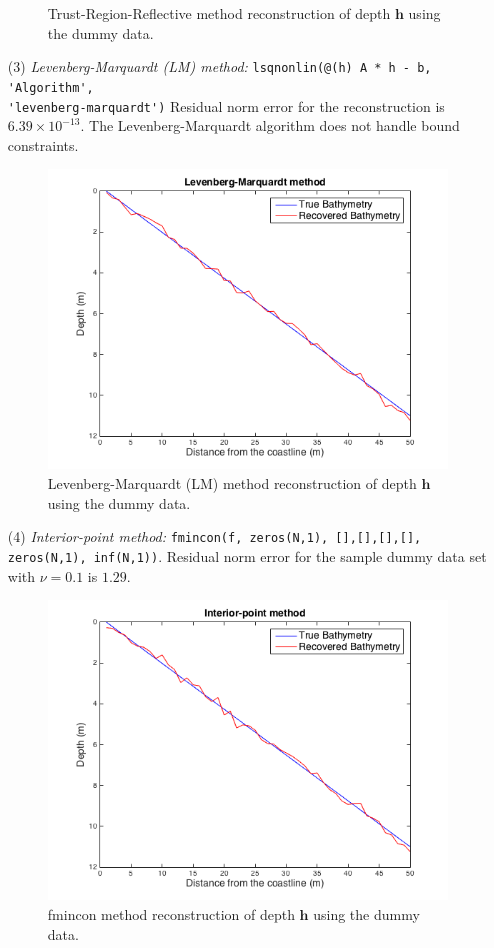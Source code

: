 \begin{itemize}
\begin{figure}[H]
\caption{Trust-Region-Reflective method reconstruction of depth $\mathbf{h}$ using the dummy data.}
\label{trust_region_fig}
\end{figure}
\item[(3)]  \textit{Levenberg-Marquardt (LM) method:}  
\verb|lsqnonlin(@(h) A * h - b, 'Algorithm',| \\ \verb|'levenberg-marquardt')|
Residual norm error for the reconstruction is $6.39 \times 10^{-13}$. The Levenberg-Marquardt algorithm does not handle bound constraints. 
\begin{figure}[H]
\center
\includegraphics[scale=0.6]{img/LM_linear.png} 
\caption{Levenberg-Marquardt (LM) method reconstruction of depth $\mathbf{h}$ using the dummy data.}
\label{LM_fig}
\end{figure}
\item[(4)]  \textit{Interior-point method:} \verb|fmincon(f, zeros(N,1), [],[],[],[], zeros(N,1), inf(N,1))|. Residual norm error for the sample dummy data set  with $\nu = 0.1$ is $1.29$. 
\begin{figure}[H]
\center
\includegraphics[scale=0.6]{img/fmincon_linear.png} 
\caption{fmincon method reconstruction of depth $\mathbf{h}$ using the dummy data.}
\label{LM_fig}
\end{figure}
\end{itemize}



